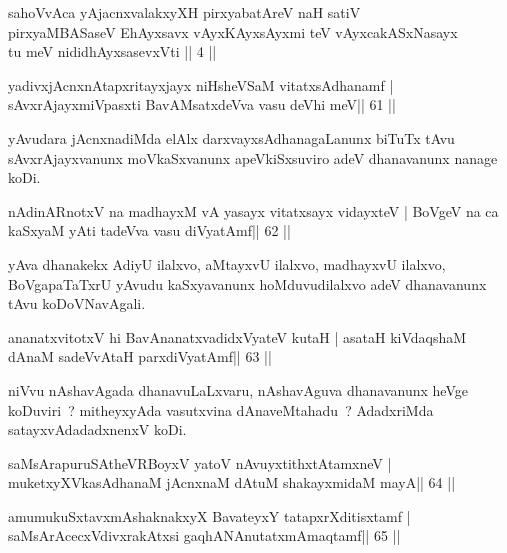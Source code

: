 \begin{shl}
sahoVvAca yAjacnxvalakxyXH pirxyabatAreV naH satiV\\
pirxyaMBASaseV EhAyxsavx vAyxKAyxsAyxmi teV vAyxcakASxNasayx\\
tu meV nididhAyxsasevxVti || 4 ||
\end{shl}

\begin{shl}
yadivxjAcnxnAtapxritayxjayx niHsheVSaM vitatxsAdhanamf |
sAvxrAjayxmiVpasxti BavAMsatxdeVva vasu deVhi meV\hfill || 61 ||
\end{shl}

\begin{artha}
yAvudara jAcnxnadiMda elAlx darxvayxsAdhanagaLanunx biTuTx tAvu sAvxrAjayxvanunx moVkaSxvanunx apeVkiSxsuviro adeV dhanavanunx nanage koDi.
\end{artha}

\begin{shl}
nA\s\s dinARnotxV na madhayxM vA yasayx vitatxsayx vidayxteV |
BoVgeV na ca kaSxyaM yAti tadeVva vasu diVyatAmf\hfill || 62 ||
\end{shl}

\begin{artha}
yAva dhanakekx AdiyU ilalxvo, aMtayxvU ilalxvo, madhayxvU ilalxvo, BoVgapaTaTxrU yAvudu kaSxyavanunx hoMduvudilalxvo adeV dhanavanunx tAvu koDoVNavAgali.
\end{artha}

\begin{shl}
ananatxvitotxV hi BavAnanatxvadidxVyateV kutaH |
asataH kiVdaqshaM dAnaM sadeVvAtaH parxdiVyatAmf\hfill || 63 ||
\end{shl}

\begin{artha}
niVvu nAshavAgada dhanavuLaLxvaru, nAshavAguva dhanavanunx heVge koDuviri~? mitheyxyAda vasutxvina dAnaveMtahadu~? AdadxriMda satayxvAdadadxnenxV koDi.
\end{artha}


\begin{shl}
saMsArapuruSAtheVRBoyxV yatoV nAvuyxtithxtAtamxneV |
muketxyXVkasAdhanaM jAcnxnaM dAtuM shakayxmidaM mayA\hfill || 64 ||
\end{shl}

\begin{shl}
amumukuSxtavxmAshaknakxyX BavateyxY tatapxrXditisxtamf |
saMsArAcecxVdivxrakAtx\s si gaqhANAnutatxmAmaqtamf\hfill || 65 ||
\end{shl}

